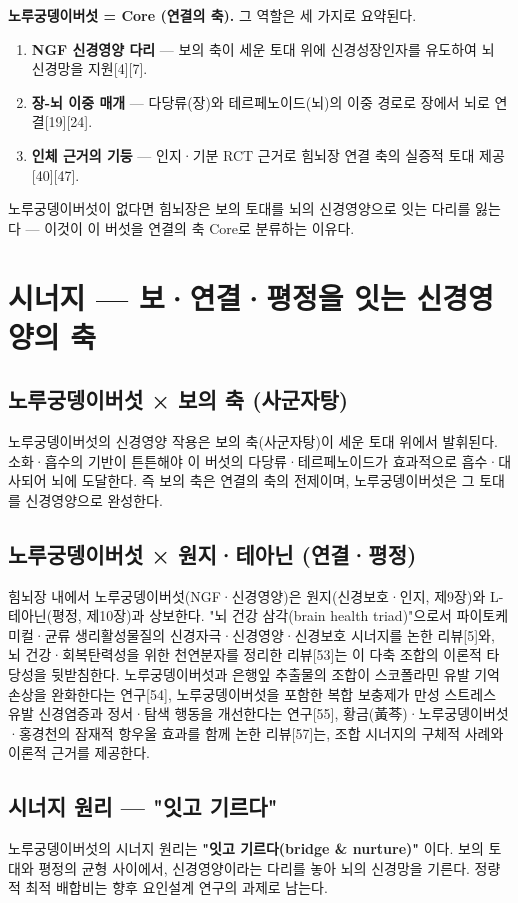 \documentclass[11pt,oneside]{book}
\begin{document}
\textbf{노루궁뎅이버섯 = Core (연결의 축).} 그 역할은 세 가지로 요약된다.

\begin{enumerate}[leftmargin=6mm,itemsep=1pt,topsep=2pt]
  \item \textbf{NGF 신경영양 다리} — 보의 축이 세운 토대 위에 신경성장인자를 유도하여 뇌 신경망을 지원[4][7].
  \item \textbf{장-뇌 이중 매개} — 다당류(장)와 테르페노이드(뇌)의 이중 경로로 장에서 뇌로 연결[19][24].
  \item \textbf{인체 근거의 기둥} — 인지·기분 RCT 근거로 힘뇌장 연결 축의 실증적 토대 제공[40][47].
\end{enumerate}
노루궁뎅이버섯이 없다면 힘뇌장은 보의 토대를 뇌의 신경영양으로 잇는 다리를 잃는다 — 이것이 이 버섯을 연결의 축 Core로 분류하는 이유다.

\section{시너지 — 보·연결·평정을 잇는 신경영양의 축}
\subsection{노루궁뎅이버섯 × 보의 축 (사군자탕)}
노루궁뎅이버섯의 신경영양 작용은 보의 축(사군자탕)이 세운 토대 위에서 발휘된다. 소화·흡수의 기반이 튼튼해야 이 버섯의 다당류·테르페노이드가 효과적으로 흡수·대사되어 뇌에 도달한다. 즉 보의 축은 연결의 축의 전제이며, 노루궁뎅이버섯은 그 토대를 신경영양으로 완성한다.

\subsection{노루궁뎅이버섯 × 원지·테아닌 (연결·평정)}
힘뇌장 내에서 노루궁뎅이버섯(NGF·신경영양)은 원지(신경보호·인지, 제9장)와 L-테아닌(평정, 제10장)과 상보한다. "뇌 건강 삼각(brain health triad)"으로서 파이토케미컬·균류 생리활성물질의 신경자극·신경영양·신경보호 시너지를 논한 리뷰[5]와, 뇌 건강·회복탄력성을 위한 천연분자를 정리한 리뷰[53]는 이 다축 조합의 이론적 타당성을 뒷받침한다. 노루궁뎅이버섯과 은행잎 추출물의 조합이 스코폴라민 유발 기억 손상을 완화한다는 연구[54], 노루궁뎅이버섯을 포함한 복합 보충제가 만성 스트레스 유발 신경염증과 정서·탐색 행동을 개선한다는 연구[55], 황금(黃芩)·노루궁뎅이버섯·홍경천의 잠재적 항우울 효과를 함께 논한 리뷰[57]는, 조합 시너지의 구체적 사례와 이론적 근거를 제공한다.

\subsection{시너지 원리 — "잇고 기르다"}
노루궁뎅이버섯의 시너지 원리는 \textbf{"잇고 기르다(bridge \& nurture)"} 이다. 보의 토대와 평정의 균형 사이에서, 신경영양이라는 다리를 놓아 뇌의 신경망을 기른다. 정량적 최적 배합비는 향후 요인설계 연구의 과제로 남는다.
\end{document}
